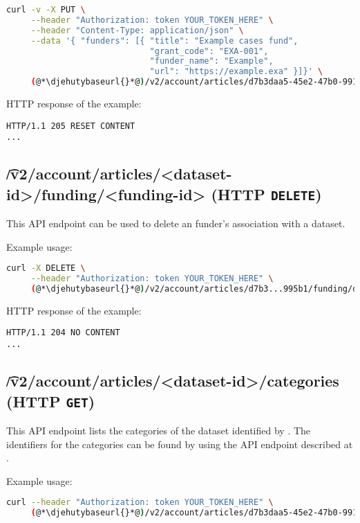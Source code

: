 \begin{lstlisting}[language=bash]
curl -v -X PUT \
     --header "Authorization: token YOUR_TOKEN_HERE" \
     --header "Content-Type: application/json" \
     --data '{ "funders": [{ "title": "Example cases fund",
                             "grant_code": "EXA-001",
                             "funder_name": "Example",
                             "url": "https://example.exa" }]}' \
     (@*\djehutybaseurl{}*@)/v2/account/articles/d7b3daa5-45e2-47b0-9910-0f7fa6a995b1/funding
\end{lstlisting}

  HTTP response of the example:
\begin{lstlisting}
HTTP/1.1 205 RESET CONTENT
...
\end{lstlisting}

\subsection{\t{/v2/account/articles/<dataset-id>/funding/<funding-id>} (HTTP \texttt{DELETE})}

  This API endpoint can be used to delete an funder's association with a dataset.

  Example usage:
\begin{lstlisting}[language=bash]
curl -X DELETE \
     --header "Authorization: token YOUR_TOKEN_HERE" \
     (@*\djehutybaseurl{}*@)/v2/account/articles/d7b3...995b1/funding/d50e...7500
\end{lstlisting}

  HTTP response of the example:
\begin{lstlisting}
HTTP/1.1 204 NO CONTENT
...
\end{lstlisting}

\subsection{\t{/v2/account/articles/<dataset-id>/categories} (HTTP \texttt{GET})}

  This API endpoint lists the categories of the dataset identified by .
  The identifiers for the categories can be found by using the API endpoint
  described at .

  Example usage:
\begin{lstlisting}[language=bash]
curl --header "Authorization: token YOUR_TOKEN_HERE" \
     (@*\djehutybaseurl{}*@)/v2/account/articles/d7b3daa5-45e2-47b0-9910-0f7fa6a995b1/categories | jq
\end{lstlisting}

